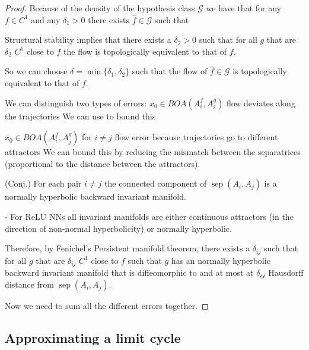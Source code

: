 \documentclass{article}
\theoremstyle{definition}
\theoremstyle{remark}
\newcommand{\sep}{\operatorname{sep}}
\begin{document}
\begin{proof}
Because of the density of the hypothesis class $\mathcal{G}$ we have that for any $f\in C^1$ and any $\delta_1>0$
there exists $\hat f\in\mathcal{G}$ such that 


Structural stability implies that there exists a $\delta_2>0$ such that for all $g$ that are $\delta_2$ $C^1$ close to $f$ the flow is topologically equivalent to that of $f$.

So we can choose $\delta = \min\{\delta_1,\delta_2\}$ such that the flow of $\hat f\in\mathcal{G}$ is topologically equivalent to that of $f$.



We can distinguish two types of errors:
$x_0\in BOA(A_i^f,A_i^g)$ flow deviates along the trajectories
We can use \citep{vanhandel2007filtering} to bound this


$x_0\in BOA(A_i^f,A_j^g)$ for $i\neq j$
flow error because trajectories go to different attractors
We can bound this by reducing the mismatch between the separatrices (proportional to the distance between the attractors).

(Conj.) For each pair $i\neq j$ the connected component of $\sep(A_i,A_j)$ is a normally hyperbolic backward invariant manifold.

- For ReLU NNs all invariant manifolds are either continuous attractors (in the direction of non-normal hyperbolicity) or normally hyperbolic.

Therefore, by Fenichel's Persistent manifold theorem, there exists a $\delta_{ij}$ such that for all $g$ that are $\delta_{ij}$ $C^1$ close to $f$ such that $g$ has an  normally hyperbolic backward invariant manifold that is diffeomorphic to and at most at $\mathcal{\delta_{ij}}$ Hausdorff distance from $\sep(A_i,A_j)$.


Now we need to sum all the different errors together.
\end{proof}



\subsection{Approximating a limit cycle}
\end{document}
